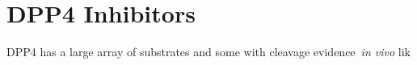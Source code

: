 \section{DPP4 Inhibitors}
DPP4 has a large array of substrates and some with cleavage evidence~\textit{in vivo} lik